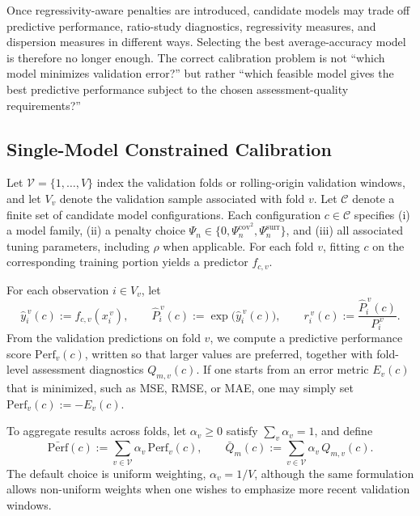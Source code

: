 \documentclass[12pt]{article}
\theoremstyle{plain}
\theoremstyle{definition}
\begin{document}
Once regressivity-aware penalties are introduced, candidate models may trade off predictive performance, ratio-study diagnostics, regressivity measures, and dispersion measures in different ways. Selecting the best average-accuracy model is therefore no longer enough. The correct calibration problem is not ``which model minimizes validation error?'' but rather ``which feasible model gives the best predictive performance subject to the chosen assessment-quality requirements?''

\subsection{Single-Model Constrained Calibration}

Let \(\mathcal V=\{1,\dots,V\}\) index the validation folds or rolling-origin validation windows, and let \(V_v\) denote the validation sample associated with fold \(v\). Let \(\mathcal C\) denote a finite set of candidate model configurations. Each configuration \(c\in\mathcal C\) specifies
(i) a model family,
(ii) a penalty choice \(\Psi_n\in\{0,\Psi_n^{\mathrm{cov}^2},\Psi_n^{\mathrm{surr}}\}\), and
(iii) all associated tuning parameters, including \(\rho\) when applicable. For each fold \(v\), fitting \(c\) on the corresponding training portion yields a predictor \(f_{c,v}\).

For each observation \(i\in V_v\), let
\[
\hat y_i^{\,v}(c):=f_{c,v}(x_i^{\,v}),
\qquad
\hat P_i^{\,v}(c):=\exp\!\bigl(\hat y_i^{\,v}(c)\bigr),
\qquad
r_i^{\,v}(c):=\frac{\hat P_i^{\,v}(c)}{P_i^{\,v}}.
\]
From the validation predictions on fold \(v\), we compute a predictive performance score \(\mathrm{Perf}_v(c)\), written so that larger values are preferred, together with fold-level assessment diagnostics \(Q_{m,v}(c)\). If one starts from an error metric \(E_v(c)\) that is minimized, such as MSE, RMSE, or MAE, one may simply set \(\mathrm{Perf}_v(c):=-E_v(c)\).

To aggregate results across folds, let \(\alpha_v\ge 0\) satisfy \(\sum_v \alpha_v=1\), and define
\[
\bar{\mathrm{Perf}}(c):=\sum_{v\in\mathcal V}\alpha_v\,\mathrm{Perf}_v(c),
\qquad
\bar Q_m(c):=\sum_{v\in\mathcal V}\alpha_v\,Q_{m,v}(c).
\]
The default choice is uniform weighting, \(\alpha_v=1/V\), although the same formulation allows non-uniform weights when one wishes to emphasize more recent validation windows.
\end{document}
